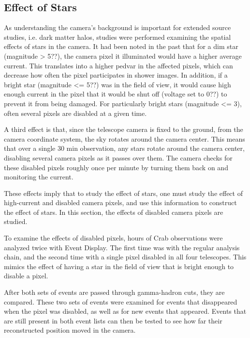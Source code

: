       
    
      
      
    

  \subsection{Effect of Stars}
    As understanding the camera's background is important for extended source studies, i.e. dark matter halos, studies were performed examining the spatial effects of stars in the camera.
    It had been noted in the past that for a dim star (magnitude > 5??), the camera pixel it illuminated would have a higher average current.
    This translates into a higher pedvar in the affected pixels, which can decrease how often the pixel participates in shower images.
    In addition, if a bright star (magnitude <= 5??) was in the field of view, it would cause high enough current in the pixel that it would be shut off (voltage set to 0??) to prevent it from being damaged.
    For particularly bright stars (magnitude <= 3), often several pixels are disabled at a given time.

    A third effect is that, since the telescope camera is fixed to the ground, from the camera coordinate system, the sky rotates around the camera center.
    This means that over a single 30 min observation, any stars rotate around the camera center, disabling several camera pixels as it passes over them.
    The camera checks for these disabled pixels roughly once per minute by turning them back on and monitoring the current.

    These effects imply that to study the effect of stars, one must study the effect of high-current and disabled camera pixels, and use this information to construct the effect of stars.
    In this section, the effects of disabled camera pixels are studied.

    To examine the effects of disabled pixels,  hours of Crab observations were analyzed twice with Event Display.
    The first time was with the regular analysis chain, and the second time with a single pixel disabled in all four telescopes.
    This mimics the effect of having a star in the field of view that is bright enough to disable a pixel.

    After both sets of events are passed through gamma-hadron cuts, they are compared.
    These two sets of events were examined for events that disappeared when the pixel was disabled, as well as for new events that appeared.
    Events that are still present in both event lists can then be tested to see how far their reconstructed position moved in the camera.

